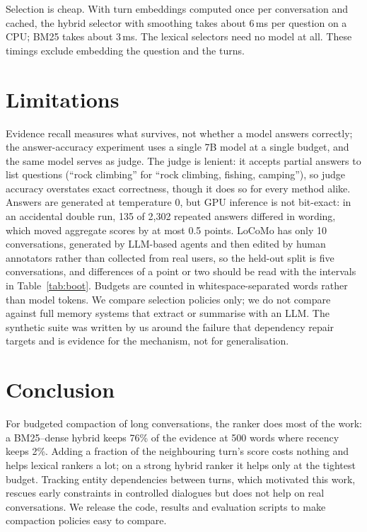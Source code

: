 \documentclass[11pt]{article}
\begin{document}
Selection is cheap. With turn embeddings computed once per conversation and cached, the hybrid
selector with smoothing takes about 6\,ms per question on a CPU; BM25 takes about 3\,ms. The
lexical selectors need no model at all. These timings exclude embedding the question and the
turns.

\section{Limitations}

Evidence recall measures what survives, not whether a model answers correctly; the
answer-accuracy experiment uses a single 7B model at a single budget, and the same model
serves as judge. The judge is lenient: it accepts partial answers to list questions (``rock
climbing'' for ``rock climbing, fishing, camping''), so judge accuracy overstates exact
correctness, though it does so for every method alike. Answers are generated at temperature 0,
but GPU inference is not bit-exact: in an accidental double run, 135 of 2,302 repeated answers
differed in wording, which moved aggregate scores by at most 0.5 points. LoCoMo has only 10
conversations, generated by LLM-based agents and then edited by human annotators rather than
collected from real users, so the held-out split is five conversations, and differences of a point or two should be read with the intervals in
Table~\ref{tab:boot}. Budgets are counted in whitespace-separated words rather than model tokens. We compare
selection policies only; we do not compare against full memory systems that extract or
summarise with an LLM. The synthetic suite was written by us around the failure that
dependency repair targets and is evidence for the mechanism, not for generalisation.

\section{Conclusion}

For budgeted compaction of long conversations, the ranker does most of the work: a BM25--dense
hybrid keeps 76\% of the evidence at 500 words where recency keeps 2\%. Adding a fraction of the
neighbouring turn's score costs nothing and helps lexical rankers a lot; on a strong hybrid
ranker it helps only at the tightest budget. Tracking
entity dependencies between turns, which motivated this work, rescues early constraints in
controlled dialogues but does not help on real conversations. We release the code, results and
evaluation scripts to make compaction policies easy to compare.
\end{document}
